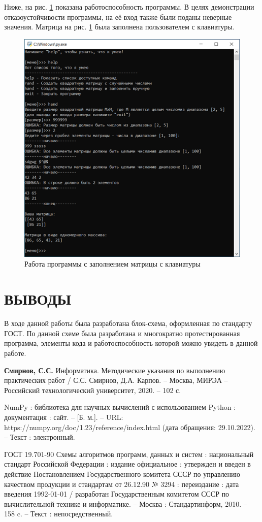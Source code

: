 \documentclass{mirea}
\begin{document}
Ниже, на рис. \ref{func:test hand} показана работоспособность программы. В целях демонстрации отказоустойчивости программы, на её вход также были поданы неверные значения. Матрица на рис. \ref{func:test hand} была заполнена пользователем с клавиатуры.
\begin{figure}[ht]
	\centering
	\includegraphics{Test hand.png}
	\caption{Работа программы с заполнением матрицы с клавиатуры}
	\label{func:test hand}
\end{figure}

\chapter{ВЫВОДЫ}
В ходе данной работы была разработана блок-схема, оформленная по стандарту ГОСТ. По данной схеме была разработана и многократно протестированная программа, элементы кода и работоспособность которой можно увидеть в данной работе.

\begin{thebibliography}{99}
	 \textbf{Смирнов, С.С.} Информатика. Методические указания по выполнению практических работ / С.С. Смирнов, Д.А. Карпов. – Москва, МИРЭА – Российский технологический университет, 2020. – 102 с.
	
	 NumPy : библиотека для научных вычислений с использованием Python : документация : сайт. – [Б. м.]. – URL: https://numpy.org/doc/1.23/reference/index.html (дата обращения: 29.10.2022). – Текст : электронный.
	
	 ГОСТ 19.701-90 Схемы алгоритмов программ, данных и систем : национальный стандарт Российской Федерации : издание официальное : утвержден и введен в действие Постановлением Государственного комитета СССР по управлению качеством продукции и стандартам от 26.12.90 № 3294 : переиздание : дата введения 1992-01-01 / разработан Государственным комитетом СССР по вычислительной технике и информатике. – Москва : Стандартинформ, 2010. – 158 c. – Текст : непосредственный.
\end{thebibliography}
\end{document}
